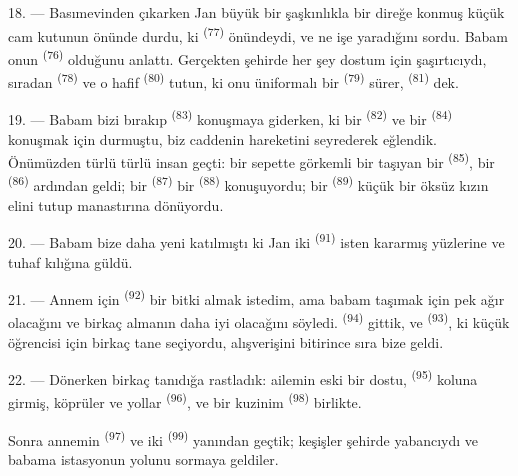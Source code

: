 \VUsaut{3.0mm}

18. --- Basımevinden çıkarken Jan büyük bir şaşkınlıkla bir direğe konmuş küçük
cam kutunun önünde durdu, ki  \textsuperscript{(77)}
önündeydi, ve ne işe yaradığını sordu. Babam onun 
\textsuperscript{(76)} olduğunu anlattı. Gerçekten şehirde her şey dostum için
şaşırtıcıydı, sıradan  \textsuperscript{(78)} ve
o hafif  \textsuperscript{(80)} tutun, ki
onu üniformalı bir  \textsuperscript{(79)} sürer,  \textsuperscript{(81)} dek.

19. --- Babam bizi bırakıp  \textsuperscript{(83)}
konuşmaya giderken, ki bir  \textsuperscript{(82)} ve bir
 \textsuperscript{(84)} konuşmak için durmuştu, biz caddenin
hareketini seyrederek eğlendik. Önümüzden türlü türlü insan geçti: bir
sepette görkemli bir  taşıyan bir 
\textsuperscript{(85)}, bir  \textsuperscript{(86)}
ardından geldi; bir  \textsuperscript{(87)} bir  \textsuperscript{(88)} konuşuyordu; bir 
\textsuperscript{(89)} küçük bir öksüz kızın elini tutup manastırına
dönüyordu.

\VUsaut{3.0mm}

20. --- Babam bize daha yeni katılmıştı ki Jan iki 
\textsuperscript{(91)} isten kararmış yüzlerine ve tuhaf kılığına güldü.

21. --- Annem için  \textsuperscript{(92)} bir bitki
almak istedim, ama babam taşımak için pek ağır olacağını ve birkaç
 almanın daha iyi olacağını söyledi.  \textsuperscript{(94)} gittik, ve 
\textsuperscript{(93)}, ki küçük öğrencisi için birkaç tane seçiyordu,
alışverişini bitirince sıra bize geldi.

22. --- Dönerken birkaç tanıdığa rastladık: ailemin eski bir dostu,
 \textsuperscript{(95)} koluna girmiş, köprüler ve yollar
 \textsuperscript{(96)}, ve bir kuzinim 
\textsuperscript{(98)} birlikte.

Sonra annemin  \textsuperscript{(97)} ve iki
 \textsuperscript{(99)} yanından geçtik; keşişler şehirde
yabancıydı ve babama istasyonun yolunu sormaya geldiler.
\VUsaut{6.0mm}
\VUfilet{22mm}
